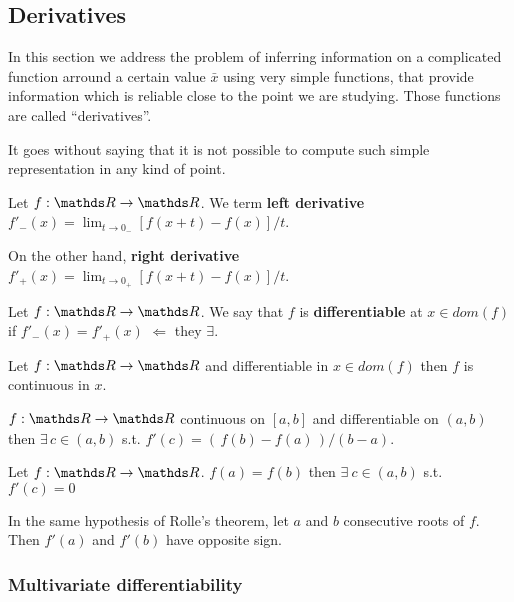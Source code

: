 \documentclass[computational_mathematics.tex]{subfiles}
\begin{document}
\subsection{Derivatives}

In this section we address the problem of inferring information on a complicated function arround a certain value $\bar{x}$ using very simple functions, that provide information which is reliable close to the point we are studying.
Those functions are called ``derivatives''.

It goes without saying that it is not possible to compute such simple representation in any kind of point.

\begin{definition}
  Let $f: \R \to \R$. We term \textbf{left derivative} $f'_{-}(x) = \lim_{t \to 0_{-}} [f(x + t) - f(x)] / t$.
  
  On the other hand, \textbf{right derivative} $f'_{+}(x) = \lim_{t \to 0_{+}} [f(x + t) - f(x)] / t$.
\end{definition}

\begin{definition}[Differentiable]
  Let $f:\R \to \R$. We say that $f$ is \textbf{differentiable} at $x \in dom(f)$ if $f'_-(x) = f'_+(x)$ $\Leftarrow$ they $\exists$.
\end{definition}

\begin{proposition}
  Let $f: \R \to \R$ and differentiable in $x \in dom(f)$ then $f$ is continuous in $x$. 
\end{proposition}


\begin{theorem}
$f : \R \to \R$ continuous on $[a, b]$ and differentiable on $(a,b)$ then $\exists \, c \in (a, b)$ s.t. $f'(c) = ( \, f(b) - f(a) \, ) / (b - a)$.
\end{theorem}

\begin{theorem}
Let $f: \R \to \R$. $f(a) = f(b)$ then $\exists~c \in (a, b)$ s.t.~$f'(c) = 0$
\end{theorem}

\begin{corollary}
In the same hypothesis of Rolle's theorem, let $a$ and $b$ consecutive roots of $f$. Then $f'(a)$ and $f'(b)$ have opposite sign.
\end{corollary}

\subsubsection{Multivariate differentiability}
\end{document}
